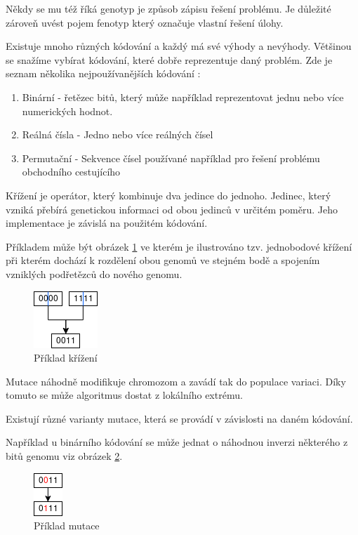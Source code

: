 Někdy se mu též říká genotyp je způsob zápisu řešení problému. Je důležité zároveň uvést pojem fenotyp který označuje vlastní řešení úlohy.

Existuje mnoho různých kódování a každý má své výhody a nevýhody. Většinou se snažíme vybírat kódování, které dobře reprezentuje daný problém. Zde je seznam několika nejpoužívanějších kódování \cite[s.~42-43]{geneticCZ}:
\begin{enumerate}
	\item Binární - řetězec bitů, který může například reprezentovat jednu nebo více numerických hodnot. 
	\item Reálná čísla - Jedno nebo více reálných čísel
	\item Permutační - Sekvence čísel používané například pro řešení problému obchodního cestujícího 
\end{enumerate}
Křížení je operátor, který kombinuje dva jedince do jednoho. Jedinec, který vzniká přebírá genetickou informaci od obou jedinců v určitém poměru. Jeho implementace je závislá na použitém kódování. 

Příkladem může být obrázek \ref{fig:crossover} ve kterém je ilustrováno tzv. jednobodové křížení \cite[s.~50]{geneticCZ} při kterém dochází k rozdělení obou genomů ve stejném bodě a spojením vzniklých podřetězců do nového genomu.
	
\begin{figure}[ht]
	\centering
	\includegraphics[scale=0.95]{crossover}
	\caption{Příklad křížení}
	\label{fig:crossover}
\end{figure}

Mutace náhodně modifikuje chromozom a zavádí tak do populace variaci. Díky tomuto se může algoritmus dostat z lokálního extrému. 

Existují různé varianty mutace, která se provádí v závislosti na daném kódování. 

Například u binárního kódování se může jednat o náhodnou inverzi některého z bitů genomu viz obrázek \ref{fig:mutation}.

\begin{figure}[h!]
	\centering
	\includegraphics[scale=1.0]{mutation}
	\caption{Příklad mutace}
	\label{fig:mutation}
\end{figure}

